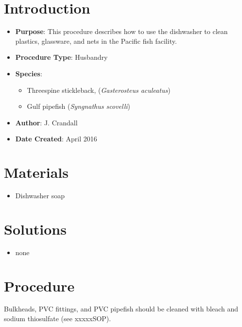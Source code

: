 \documentclass[
  letterpaper,
  DIV=11,
  numbers=noendperiod]{scrreprt}
\providecommand{\tightlist}{%
  \setlength{\itemsep}{0pt}\setlength{\parskip}{0pt}}\usepackage{longtable,booktabs,array}
\begin{document}
\hypertarget{introduction-40}{%
\section{Introduction}\label{introduction-40}}

\begin{itemize}
\tightlist
\item
  \textbf{Purpose}: This procedure describes how to use the dishwasher
  to clean plastics, glassware, and nets in the Pacific fish facility.
\item
  \textbf{Procedure Type}: Husbandry
\item
  \textbf{Species}:

  \begin{itemize}
  \tightlist
  \item
    Threespine stickleback, (\emph{Gasterosteus aculeatus})
  \item
    Gulf pipefish (\emph{Syngnathus scovelli})
  \end{itemize}
\item
  \textbf{Author}: J. Crandall
\item
  \textbf{Date Created}: April 2016
\end{itemize}

\hypertarget{materials-38}{%
\section{Materials}\label{materials-38}}

\begin{itemize}
\tightlist
\item
  Dishwasher soap
\end{itemize}

\hypertarget{solutions-30}{%
\section{Solutions}\label{solutions-30}}

\begin{itemize}
\tightlist
\item
  none
\end{itemize}

\hypertarget{procedure-39}{%
\section{Procedure}\label{procedure-39}}

\begin{tcolorbox}[enhanced jigsaw, toprule=.15mm, breakable, coltitle=black, leftrule=.75mm, title=\textcolor{quarto-callout-note-color}{\faInfo}\hspace{0.5em}{NOTE}, bottomrule=.15mm, toptitle=1mm, bottomtitle=1mm, colframe=quarto-callout-note-color-frame, opacityback=0, colback=white, opacitybacktitle=0.6, colbacktitle=quarto-callout-note-color!10!white, rightrule=.15mm, titlerule=0mm, arc=.35mm, left=2mm]

Bulkheads, PVC fittings, and PVC pipefish should be cleaned with bleach
and sodium thiosulfate (see xxxxxSOP).

\end{tcolorbox}
\end{document}
